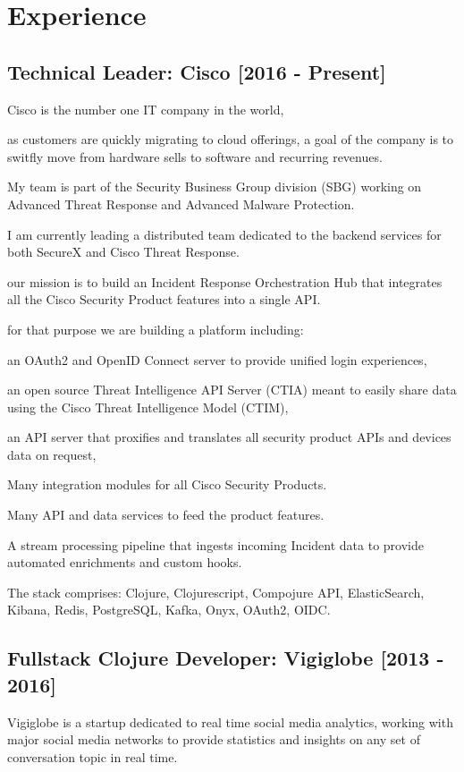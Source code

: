 \documentclass{article}
\begin{document}
\section*{Experience}
\subsection*{Technical Leader: Cisco [2016 - Present]}
Cisco is the number one IT company in the world,

as customers are quickly migrating to cloud offerings,
a goal of the company is to switfly move from hardware sells to software and recurring revenues.

My team is part of the Security Business Group division (SBG) working on Advanced Threat Response and Advanced Malware Protection.

I am currently leading a distributed team dedicated to the backend services for both SecureX and Cisco Threat Response.

our mission is to build an Incident Response Orchestration Hub that integrates all the Cisco Security Product features into a single API.

for that purpose we are building a platform including:

an OAuth2 and OpenID Connect server to provide unified login experiences,

an open source Threat Intelligence API Server (CTIA) meant to easily share data using the Cisco Threat Intelligence Model (CTIM),

an API server that proxifies and translates all security product APIs and devices data on request,

Many integration modules for all Cisco Security Products.

Many API and data services to feed the product features.

A stream processing pipeline that ingests incoming Incident data to provide automated enrichments and custom hooks.

The stack comprises: Clojure, Clojurescript, Compojure API, ElasticSearch, Kibana, Redis, PostgreSQL, Kafka, Onyx, OAuth2, OIDC.

\subsection*{Fullstack Clojure Developer: Vigiglobe [2013 - 2016]}
Vigiglobe is a startup dedicated to real time social media analytics, working with major social media networks to provide statistics and insights
on any set of conversation topic in real time.
\end{document}
